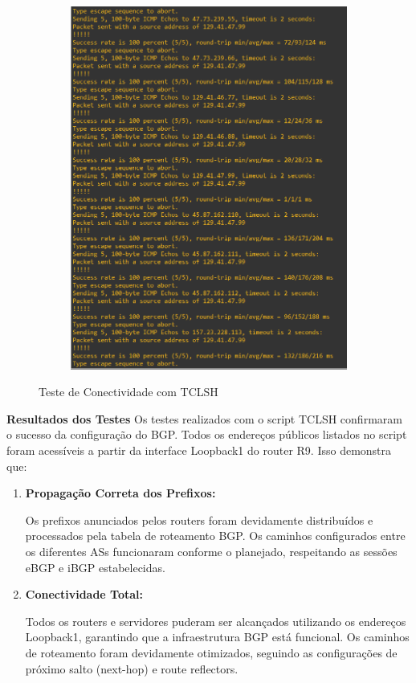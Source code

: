\documentclass[11pt,english, openright, oneside]{book}
\begin{document}
\begin{figure}[H]
\begin{subfigure}{.5\textwidth}
      \includegraphics[width=1\linewidth]{imagens/Tarefa2/7.tcl_R9_2.png}
  \end{subfigure}
  \caption{Teste de Conectividade com TCLSH}
  \label{fig:tarefa2_teste_tclsh}
\end{figure}
\vspace{0.2cm}

\textbf{Resultados dos Testes}
Os testes realizados com o script TCLSH confirmaram o sucesso da configuração do BGP. Todos os endereços públicos listados no script foram acessíveis a partir da interface Loopback1 do router R9. Isso demonstra que:
\begin{enumerate}
  \item \textbf{Propagação Correta dos Prefixos:} \par
  Os prefixos anunciados pelos routers foram devidamente distribuídos e processados pela tabela de roteamento BGP.
  Os caminhos configurados entre os diferentes ASs funcionaram conforme o planejado, respeitando as sessões eBGP e iBGP estabelecidas.
  \item \textbf{Conectividade Total:} \par
  Todos os routers e servidores puderam ser alcançados utilizando os endereços Loopback1, garantindo que a infraestrutura BGP está funcional.
  Os caminhos de roteamento foram devidamente otimizados, seguindo as configurações de próximo salto (next-hop) e route reflectors.
\end{enumerate}
\end{document}
